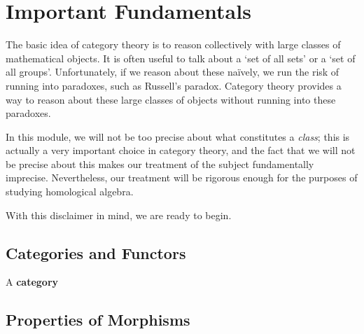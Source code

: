 \section{Important Fundamentals}

The basic idea of category theory is to reason collectively with large classes of mathematical objects. It is often useful to talk about a `set of all sets' or a `set of all groups'. Unfortunately, if we reason about these naïvely, we run the risk of running into paradoxes, such as Russell's paradox. Category theory provides a way to reason about these large classes of objects without running into these paradoxes.

In this module, we will not be too precise about what constitutes a \textit{class}; this is actually a very important choice in category theory, and the fact that we will not be precise about this makes our treatment of the subject fundamentally imprecise. Nevertheless, our treatment will be rigorous enough for the purposes of studying homological algebra.

With this disclaimer in mind, we are ready to begin.

\subsection{Categories and Functors}

\begin{boxdefinition}[Category]
    A \textbf{category}
\end{boxdefinition}

\subsection{Properties of Morphisms}
